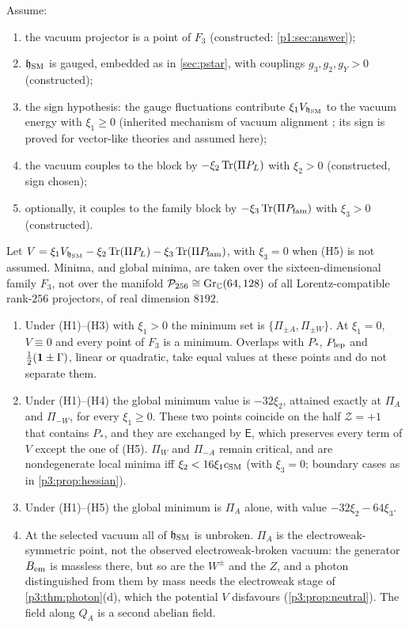 \begin{theorem}[Selection on $F_3$]
\label{p3:thm:selection}
Assume:
\begin{enumerate}[label=(H\arabic*),leftmargin=2.6em]
\item the vacuum projector is a point of $F_3$ (constructed: \cref{p1:sec:answer});
\item $\mathfrak h_{\rm SM}$ is gauged, embedded as in \cref{sec:pstar}, with couplings $g_3,g_2,g_Y>0$ (constructed);
\item the sign hypothesis: the gauge fluctuations contribute $\xi_1 V_{\mathfrak h_{\rm SM}}$ to the vacuum energy with $\xi_1\ge0$ (inherited mechanism of vacuum alignment
\cite{Peskin80,Preskill81}; its sign is proved for vector-like theories \cite{Witten83} and assumed here);
\item the vacuum couples to the block by $-\xi_2\operatorname{Tr}(\Pi P_L)$ with $\xi_2>0$ (constructed, sign chosen);
\item optionally, it couples to the family block by $-\xi_3\operatorname{Tr}(\Pi P_{\rm fam})$ with $\xi_3>0$ (constructed).
\end{enumerate}
Let $V=\xi_1 V_{\mathfrak h_{\rm SM}}-\xi_2\operatorname{Tr}(\Pi P_L)-\xi_3\operatorname{Tr}(\Pi P_{\rm fam})$, with $\xi_3=0$ when (H5) is not assumed. Minima, and global minima, are taken over the
sixteen-dimensional family $F_3$, not over the manifold $\mathcal P_{256}\cong\mathrm{Gr}_{\mathbb{C}}(64,128)$ of all Lorentz-compatible rank-$256$ projectors, of real dimension
$8192$.
\begin{enumerate}[label=(\alph*),leftmargin=2.2em]
\item Under (H1)--(H3) with $\xi_1>0$ the minimum set is $\{\Pi_{\pm A},\Pi_{\pm W}\}$. At $\xi_1=0$, $V\equiv0$ and every point of $F_3$ is a minimum. Overlaps with $P_*$, $P_{\rm lep}$ and $\tfrac12(\mathbf 1\pm\Gamma)$, linear or quadratic, take equal values at
these points and do not separate them.
\item Under (H1)--(H4) the global minimum value is $-32\xi_2$, attained exactly at $\Pi_A$ and $\Pi_{-W}$, for every $\xi_1\ge0$. These two points coincide on the half
$\mathcal Z=+1$ that contains $P_*$, and they are exchanged by $\mathsf E$, which preserves every term of $V$ except the one of (H5). $\Pi_W$ and $\Pi_{-A}$ remain critical, and are
nondegenerate local minima iff $\xi_2<16\xi_1 c_{\rm SM}$ (with $\xi_3=0$; boundary cases as in \cref{p3:prop:hessian}).
\item Under (H1)--(H5) the global minimum is $\Pi_A$ alone, with value $-32\xi_2-64\xi_3$.
\item At the selected vacuum all of $\mathfrak h_{\rm SM}$ is unbroken. $\Pi_A$ is the electroweak-symmetric point, not the observed electroweak-broken vacuum:
the generator $B_{\rm em}$ is massless there, but so are the $W^\pm$ and the $Z$, and a photon distinguished from them by mass needs the electroweak stage of
\cref{p3:thm:photon}(d), which the potential $V$ disfavours (\cref{p3:prop:neutral}). The field along $Q_A$ is a second abelian field.
\end{enumerate}
\end{theorem}

